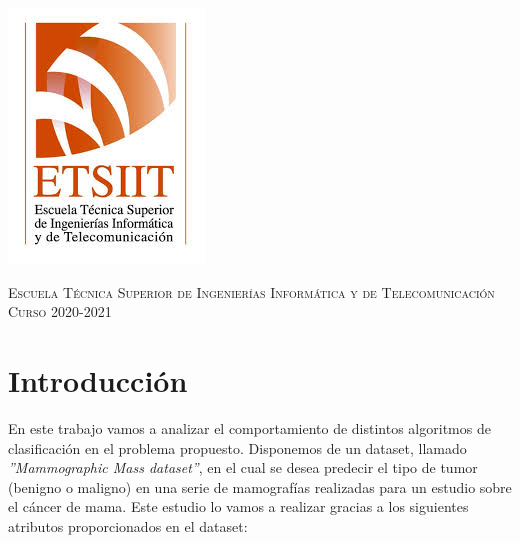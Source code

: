\documentclass[11pt,a4paper]{article}
\begin{document}
\begin{titlepage}
\begin{minipage}{\textwidth}
\includegraphics[scale=0.3]{img/etsiit.jpeg}

\vspace{0.3cm}
\textsc{Escuela Técnica Superior de Ingenierías Informática y de Telecomunicación}\\
\vspace{1cm}
\textsc{Curso 2020-2021}
\end{minipage}
\end{titlepage}

\tableofcontents
\thispagestyle{empty}				%

\newpage

\setlength{\parskip}{1em}



\section{Introducción}

En este trabajo vamos a analizar el comportamiento de distintos algoritmos de clasificación en el problema propuesto. Disponemos
de un dataset, llamado \textit{''Mammographic Mass dataset''}, en el cual se desea predecir el tipo de tumor (benigno o maligno)
en una serie de mamografías realizadas para un estudio sobre el cáncer de mama. Este estudio lo vamos a realizar gracias a los
siguientes atributos proporcionados en el dataset:
\end{document}
